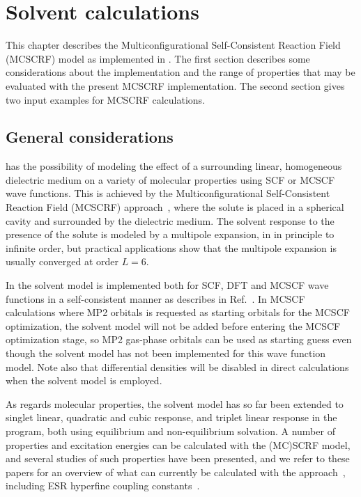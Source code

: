 \chapter{Solvent calculations}\label{ch:solvent}

This chapter describes the 
Multiconfigurational Self-Consistent Reaction Field (MCSCRF) model
as implemented in {\dalton}. The first section describes some
considerations about the implementation  and the range of
properties that may be evaluated with the present MCSCRF
implementation. The second section gives two input examples for
MCSCRF calculations.

\section{General considerations}\label{sec:solventimpl}

{\dalton} has the possibility of modeling the effect of a
surrounding linear, homogeneous dielectric
medium on a variety of molecular properties using
SCF or MCSCF
wave functions. This is achieved by the Multiconfigurational
Self-Consistent Reaction Field
(MCSCRF)
approach~\cite{kvmedpsjpc91,kvmhahjajthjcp89}, where the solute is
placed in a spherical cavity and surrounded by the
dielectric medium. The solvent response to the presence of the
solute is modeled by a multipole 
expansion, in {\dalton} in principle to infinite order, but
practical applications show that the multipole expansion is
usually converged at order $L=6$.

In {\dalton} the solvent model is implemented both for SCF, DFT and MCSCF wave
functions in a self-consistent manner as describes in
Ref.~\cite{kvmedpsjpc91,kvmhahjajthjcp89}. In MCSCF calculations where
MP2 orbitals is requested as starting orbitals for the MCSCF
optimization, the solvent model will not be added before entering the
MCSCF optimization stage, so MP2 gas-phase orbitals can be used as
starting guess even though the solvent model has not been implemented
for this wave function model. Note also that differential densities will be
disabled in direct calculations when the solvent model is employed.

As regards molecular properties, the solvent model has so far been
extended to singlet linear, quadratic and cubic response, and  triplet
linear response
in the {\resp} program, both using equilibrium and non-equilibrium
solvation. A number of properties and excitation energies can
be calculated with the (MC)SCRF model, and several studies of such
properties have been presented, and we refer to these papers for an
overview of what can currently be calculated with the
approach~\cite{kvmpjhjajjcp100,kvmylhapjjcp100}, including ESR
hyperfine coupling
constants~\cite{bfocobpjkvmjcp104}.

